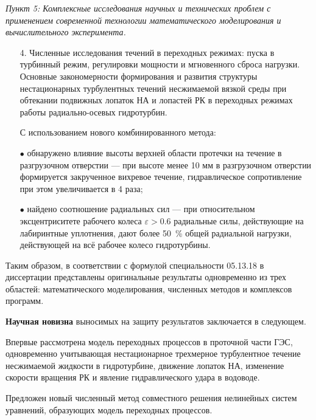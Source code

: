 \noindent
\textit{Пункт 5: Комплексные исследования научных и технических проблем с применением современной 
технологии математического моделирования и вычислительного эксперимента.}
\vspace{-2mm}
\begin{enumerate}
  \setlength{\itemsep}{1pt} \setlength{\parskip}{0pt} \setlength{\parsep}{0pt}
  \item[4.] Численные исследования течений в переходных режимах: пуска в турбинный режим, регулировки 
            мощности и мгновенного сброса нагрузки. Основные закономерности формирования и 
            развития структуры нестационарных турбулентных течений несжимаемой вязкой среды при 
            обтекании подвижных лопаток НА и лопастей РК в переходных режимах работы радиально-осевых 
            гидротурбин. 

            С использованием нового комбинированного метода: 
            
            $\bullet$ обнаружено влияние высоты верхней области протечки на течение в разгрузочном 
            отверстии --- при высоте менее 10 мм в разгрузочном отверстии 
            формируется закрученное вихревое течение, гидравлическое сопротивление при этом увеличивается 
            в 4 раза; 
            
            $\bullet$ найдено соотношение радиальных сил --- при относительном эксцентриситете 
            рабочего колеса $\varepsilon > 0.6$ радиальные силы, действующие на лабиринтные уплотнения, 
            дают более 50~\% общей радиальной нагрузки, действующей на всё рабочее колесо гидротурбины. 
\end{enumerate}

\noindent
Таким образом, в соответствии с формулой специальности 05.13.18 в диссертации представлены 
оригинальные результаты одновременно из трех областей: математического моделирования, 
численных методов и комплексов программ.

\textbf{Научная новизна} выносимых на защиту результатов заключается в следующем. 

Впервые рассмотрена модель переходных процессов в проточной части ГЭС, одновременно 
учитывающая нестационарное трехмерное турбулентное течение 
несжимаемой жидкости в гидротурбине, движение лопаток НА, изменение скорости 
вращения РК и явление гидравлического удара в водоводе. 

Предложен новый численный метод совместного решения нелинейных систем уравнений, образующих
модель переходных процессов.

